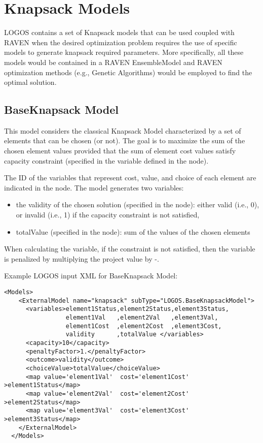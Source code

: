 \section{Knapsack Models}
\label{sec:KnapsackModels}

LOGOS contains a set of Knapsack models that can be used coupled with RAVEN when 
the desired optimization problem requires the use of specific models to generate
knapsack required parameters.
More specifically, all these models would be contained in a RAVEN EnsembleModel 
and RAVEN optimization methods (e.g., Genetic Algorithms) would be employed to 
find the optimal solution.


\subsection{BaseKnapsack Model}
\label{subsec:BaseKnapsackModel}
This model considers the classical Knapsack Model characterized by a set of elements 
that can be chosen (or not).
The goal is to maximize the sum of the chosen element values provided that the sum of 
element cost values satisfy capacity constraint (specified in the variable defined 
in the  node).

The ID of the variables that represent cost, value, and choice of each element are 
indicated in the  node.
The model generates two variables:
\begin{itemize}
  \item the validity of the chosen solution (specified in the  node): either 
        valid (i.e., 0), or invalid (i.e., 1) if the capacity constraint is not satisfied,
  \item totalValue (specified in the  node): sum of the values of the 
        chosen elements
\end{itemize}

When calculating the  variable, if the  constraint 
is not satisfied, then the  variable is penalized by multiplying the 
project value by -.

Example LOGOS input XML for BaseKnapsack Model:
\begin{lstlisting}[style=XML]
  <Models>
    <ExternalModel name="knapsack" subType="LOGOS.BaseKnapsackModel">
      <variables>element1Status,element2Status,element3Status,
                 element1Val   ,element2Val   ,element3Val,
                 element1Cost  ,element2Cost  ,element3Cost,
                 validity      ,totalValue </variables>
      <capacity>10</capacity>
      <penaltyFactor>1.</penaltyFactor>
      <outcome>validity</outcome>
      <choiceValue>totalValue</choiceValue>
      <map value='element1Val'  cost='element1Cost' >element1Status</map>
      <map value='element2Val'  cost='element2Cost' >element2Status</map>
      <map value='element3Val'  cost='element3Cost' >element3Status</map>
    </ExternalModel>
  </Models>
\end{lstlisting}



